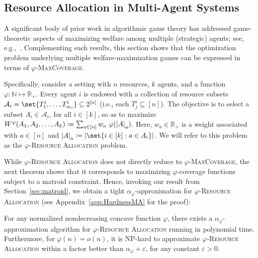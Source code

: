 \subsection{Resource Allocation in Multi-Agent Systems}
\label{subsection:welfare-maximization}
A significant body of prior work in algorithmic game theory has addressed game-theoretic aspects of maximizing welfare among multiple (strategic) agents; see, e.g.,~\cite{PM19}. Complementing such results, this section shows that the optimization problem underlying multiple welfare-maximization games can be expressed in terms of $\varphi$-\textsc{MaxCoverage}. 

Specifically, consider a setting with $n$ resources, $k$ agents, and a function $\varphi: \mathbb{N} \mapsto \mathbb{R}_+$. Every agent $i$ is endowed with a collection of resource subsets $\mathcal{A}_i = \set{T^i_1, \ldots, T^i_{m_i}}  \subseteq 2^{[n]}$ (i.e., each $T^i_j \subseteq [n]$). The objective is to select a subset $A_i \in \mathcal{A}_i$, for all $i \in [k]$, so as to maximize $W^{\varphi}(A_1, A_2, \ldots, A_k)  \coloneqq \sum_{a \in [n]} w_a \ \varphi(\abs{A}_a)$. Here, $w_a \in \mathbb{R}_+$ is a weight associated with $a \in [n]$ and $\abs{A}_a \coloneqq  \abs{\set{i \in [k] : a \in A_i}}$. We will refer to this problem as the $\varphi$-\textsc{Resource Allocation} problem.

While $\varphi$-\textsc{Resource Allocation} does not directly reduce to $\varphi$-\textsc{MaxCoverage}, the next theorem shows that it corresponds to maximizing $\varphi$-coverage functions subject to a matroid constraint. Hence, invoking our result from Section~\ref{sec:matroid}, we obtain a tight $\alpha_\varphi$-approximation for $\varphi$-\textsc{Resource Allocation} (see Appendix~\ref{app:HardnessMA} for the proof):

\begin{theorem}
For any normalized nondecreasing concave function $\varphi$, there exists a $\alpha_\varphi$-approximation algorithm for $\varphi$-\textsc{Resource Allocation} running in polynomial time. Furthermore, for $\varphi(n) = o(n)$, it is \textrm{NP}-hard to approximate $\varphi$-\textsc{Resource Allocation} within a factor better than $\alpha_\varphi + \varepsilon$, for any constant $\varepsilon >0$.
  \label{theo:HardnessMA}
\end{theorem}


